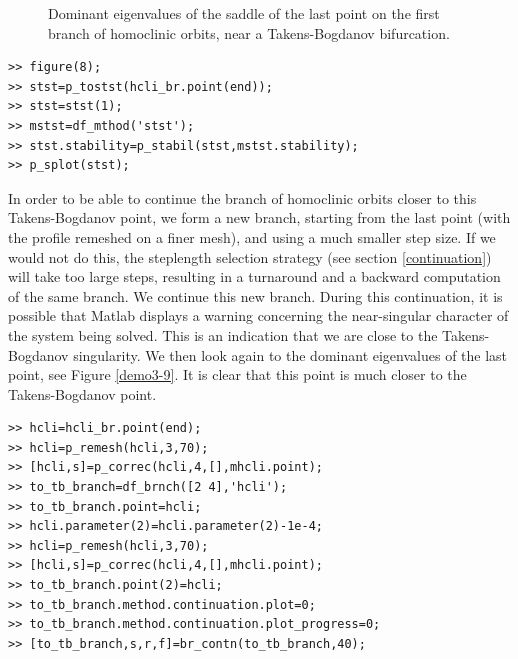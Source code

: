 \documentclass[10pt]{article}
\begin{document}
{\begin{figure}
\begin{center}
\caption{\small Dominant eigenvalues of the saddle of the last point on the first branch
of homoclinic orbits,
near a Takens-Bogdanov bifurcation.\label{demo3-8}}
\end{center}
\end{figure}
{\small\begin{verbatim}
>> figure(8);
>> stst=p_tostst(hcli_br.point(end));
>> stst=stst(1);
>> mstst=df_mthod('stst');
>> stst.stability=p_stabil(stst,mstst.stability);
>> p_splot(stst);
\end{verbatim}}

In order to be able to continue the branch of homoclinic orbits closer to
this Takens-Bogdanov point, we form a 
new branch, starting from the last point (with the profile remeshed on a
finer mesh), and using a much smaller step size.  If we would
 not do this, the 
steplength selection strategy (see section \ref{continuation}) will take 
too large steps, resulting in a turnaround and a backward 
computation of the same branch.
We continue this new branch.  During this continuation, it is possible
that Matlab displays a warning concerning the near-singular character of the
system being solved.  This is an indication that we are close to the Takens-Bogdanov singularity.  We then look again to the dominant eigenvalues of the 
last point, see Figure \ref{demo3-9}.  
  It is clear that this point is much closer to the Takens-Bogdanov
point.
{\small\begin{verbatim}
>> hcli=hcli_br.point(end);
>> hcli=p_remesh(hcli,3,70);
>> [hcli,s]=p_correc(hcli,4,[],mhcli.point);
>> to_tb_branch=df_brnch([2 4],'hcli');
>> to_tb_branch.point=hcli;
>> hcli.parameter(2)=hcli.parameter(2)-1e-4;
>> hcli=p_remesh(hcli,3,70);
>> [hcli,s]=p_correc(hcli,4,[],mhcli.point);
>> to_tb_branch.point(2)=hcli;
>> to_tb_branch.method.continuation.plot=0;
>> to_tb_branch.method.continuation.plot_progress=0;
>> [to_tb_branch,s,r,f]=br_contn(to_tb_branch,40);


\end{verbatim}}}
\end{document}
